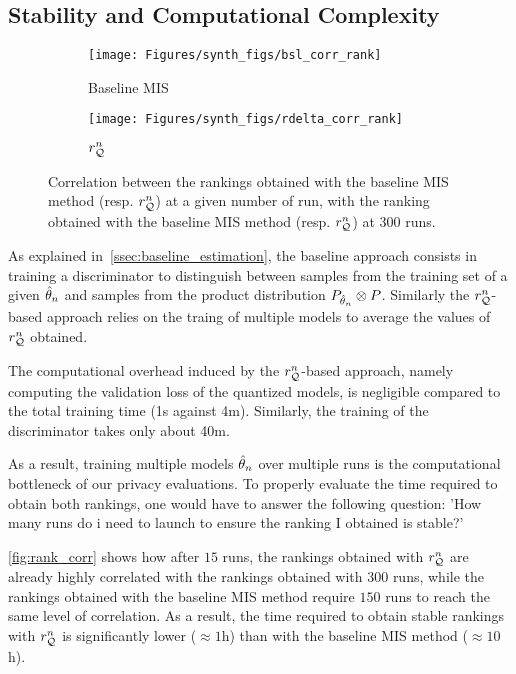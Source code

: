 
\subsection{Stability and Computational Complexity}
\label{ssec:stability}

\begin{figure}[h]
        \begin{subfigure}{0.48\linewidth}
        \centering
        \texttt{[image: Figures/synth\_figs/bsl\_corr\_rank]}
        \caption{
            Baseline MIS
        }
        \label{fig:bsl_corr_rank}
    \end{subfigure}
    \begin{subfigure}{0.48\linewidth}
        \centering
        \texttt{[image: Figures/synth\_figs/rdelta\_corr\_rank]}
        \caption{
            $r_{{\mathcal{Q}}}^n$
        }
        \label{fig:rdelta_corr_rank}
    \end{subfigure}
    \caption{
        Correlation between the rankings obtained with the baseline MIS method (resp. $r_{{\mathcal{Q}}}^n$) at a given number of run, with the ranking obtained with the baseline MIS method (resp. $r_{{\mathcal{Q}}}^n$) at 300 runs.
    }
    \label{fig:rank_corr}
\end{figure}

As explained in~\autoref{ssec:baseline_estimation}, the baseline approach consists in training a discriminator to distinguish between samples from the training set of a given ${\hat{\theta}_n}$ and samples from the product distribution $P_{{\hat{\theta}_n}}\otimes P$.
Similarly the $r_{{\mathcal{Q}}}^n$-based approach relies on the traing of multiple models to average the values of $r_{{\mathcal{Q}}}^n$ obtained.

The computational overhead induced by the $r_{{\mathcal{Q}}}^n$-based approach, namely computing the validation loss of the quantized models, is negligible compared to the total training time (1s against 4m).
Similarly, the training of the discriminator takes only about 40m.

As a result, training multiple models ${\hat{\theta}_n}$ over multiple runs is the computational bottleneck of our privacy evaluations.
To properly evaluate the time required to obtain both rankings, one would have to answer the following question: 'How many runs do i need to launch to ensure the ranking I obtained is stable?'

\autoref{fig:rank_corr} shows how after $15$ runs, the rankings obtained with $r_{{\mathcal{Q}}}^n$ are already highly correlated with the rankings obtained with 300 runs, while the rankings obtained with the baseline MIS method require $150$ runs to reach the same level of correlation.
As a result, the time required to obtain stable rankings with $r_{{\mathcal{Q}}}^n$ is significantly lower (\(\approx 1\)h) than with the baseline MIS method (\(\approx 10\)h).


